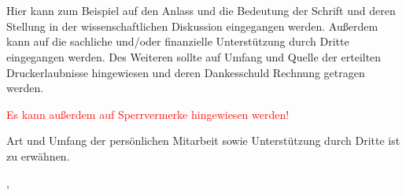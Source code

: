 \section*{\preamblename}\label{sec:\preamblename}

Hier kann zum Beispiel auf den Anlass und die Bedeutung der Schrift und deren Stellung in der wissenschaftlichen Diskussion eingegangen werden.
Außerdem kann auf die sachliche und/oder finanzielle Unterstützung durch Dritte eingegangen werden.
Des Weiteren sollte auf Umfang und Quelle der erteilten Druckerlaubnisse hingewiesen und deren Dankesschuld Rechnung getragen werden.

\textcolor{red}{Es kann außerdem auf Sperrvermerke hingewiesen werden!}

Art und Umfang der persönlichen Mitarbeit sowie Unterstützung durch Dritte ist zu erwähnen.

\vspace{0.5cm}

\raggedright{\preamblelocation, \preambledate}
\hfill
\raggedleft{\textit{\thesisauthor}}